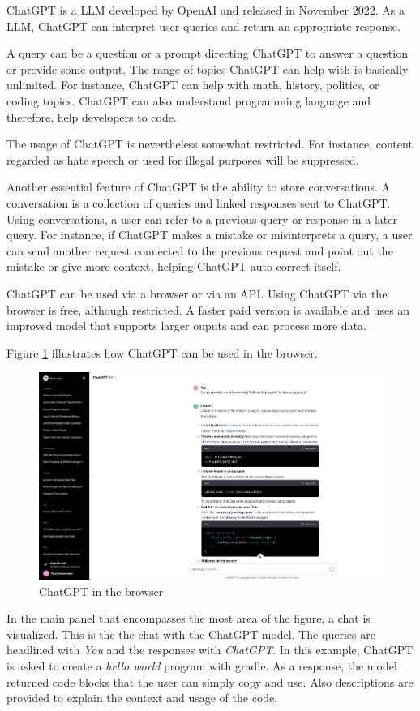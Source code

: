 ChatGPT \cite{ChatGPT_url} is a \ac{LLM} developed by OpenAI and released in November 2022. As a \ac{LLM}, ChatGPT can interpret user queries and return an appropriate response. 

A query can be a question or a prompt directing ChatGPT to answer a question or provide some output. The range of topics ChatGPT can help with is basically unlimited. For instance, ChatGPT can help with math, history, politics, or coding topics. ChatGPT can also understand programming language and therefore, help developers to code.  

The usage of ChatGPT is nevertheless somewhat restricted. For instance, content regarded as hate speech or used for illegal purposes will be suppressed.

Another essential feature of ChatGPT is the ability to store conversations. A conversation is a collection of queries and linked responses sent to ChatGPT. Using conversations, a user can refer to a previous query or response in a later query. For instance, if ChatGPT makes a mistake or misinterprets a query, a user can send another request connected to the previous request and point out the mistake or give more context, helping ChatGPT auto-correct itself. 

ChatGPT can be used via a browser or via an \ac{API}. Using ChatGPT via the browser is free, although restricted. A faster paid version is available and uses an improved model that supports larger ouputs and can process more data.

Figure \ref{fig:chatgpt_browser} illustrates how ChatGPT can be used in the browser.
\begin{figure}
    \centering
\includegraphics[width=\columnwidth]{figures/chapter2/chatgpt_browser.png}
    \caption{ChatGPT in the browser}
    \label{fig:chatgpt_browser}
\end{figure}
In the main panel that encompasses the most area of the figure, a chat is visualized. This is the the chat with the ChatGPT model. The queries are headlined with \textit{You} and the responses with \textit{ChatGPT}. In this example, ChatGPT is asked to create a \textit{hello world} program with gradle. As a response, the model returned code blocks that the user can simply copy and use. Also descriptions are provided to explain the context and usage of the code.

